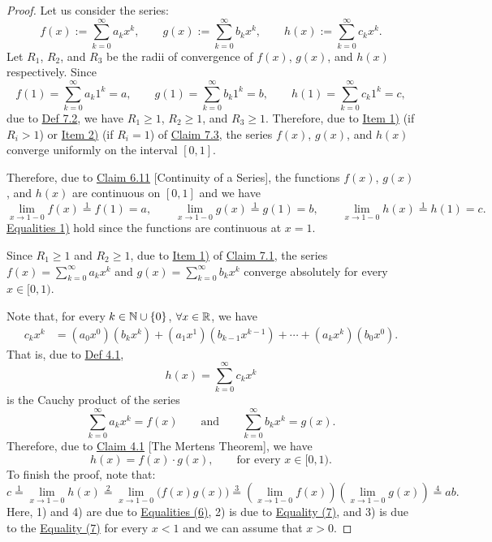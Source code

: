 \begin{proof}
Let us consider the series:
\[
f(x):=\sum_{k=0}^{\infty}a_kx^k,
\qquad
g(x):=\sum_{k=0}^{\infty}b_kx^k,
\qquad
h(x):=\sum_{k=0}^{\infty}c_kx^k.
\]
Let $R_1$, $R_2$, and $R_3$ be the radii of convergence of $f(x)$, $g(x)$, and $h(x)$ respectively.
Since
\[
f(1)=\sum_{k=0}^{\infty}a_k1^k=a,
\qquad
g(1)=\sum_{k=0}^{\infty}b_k1^k=b,
\qquad
h(1)=\sum_{k=0}^{\infty}c_k1^k=c,
\]
due to \hyperref[def:7.2]{Def 7.2}, we have $R_1\geq1$, $R_2\geq1$, and $R_3\geq1$.
Therefore, due to \hyperref[item:claim:7.3:1]{Item 1)} (if $R_i>1$) or \hyperref[item:claim:7.3:2]{Item 2)} (if $R_i=1$) of \hyperref[claim:7.3]{Claim 7.3}, the series $f(x)$, $g(x)$, and $h(x)$ converge uniformly on the interval $[0,1]$.

Therefore, due to \hyperref[claim:6.11]{Claim 6.11} [Continuity of a Series], the functions $f(x)$, $g(x)$, and $h(x)$ are continuous on $[0,1]$ and we have
\[
\lim_{x\to1-0}f(x)\overset{1}{=}f(1)=a,
\qquad
\lim_{x\to1-0}g(x)\overset{1}{=}g(1)=b,
\qquad
\lim_{x\to1-0}h(x)\overset{1}{=}h(1)=c.
\tag{6}\label{eq:7:6:1}
\]
\hyperref[eq:7:6:1]{Equalities 1)} hold since the functions are continuous at $x=1$.

Since $R_1\geq1$ and $R_2\geq1$, due to \hyperref[item:claim:7.1:1]{Item 1)} of \hyperref[claim:7.1]{Claim 7.1}, the series $f(x)=\sum_{k=0}^{\infty}a_kx^k$ and $g(x)=\sum_{k=0}^{\infty}b_kx^k$ converge absolutely for every $x\in[0,1)$.

Note that, for every $k\in\mathbb{N}\cup\{0\}$, $\forall x\in\mathbb{R}$, we have
\begin{align*}
c_kx^k
&=(a_0x^0)(b_kx^k)+(a_1x^1)(b_{k-1}x^{k-1})+\cdots+(a_kx^k)(b_0x^0).
\end{align*}
That is, due to \hyperref[def:4.1]{Def 4.1},
\[
h(x)=\sum_{k=0}^{\infty}c_kx^k
\]
is the Cauchy product of the series
\[
\sum_{k=0}^{\infty}a_kx^k=f(x)
\qquad\text{and}\qquad
\sum_{k=0}^{\infty}b_kx^k=g(x).
\]
Therefore, due to \hyperref[claim:4.1]{Claim 4.1} [The Mertens Theorem], we have
\[
h(x)=f(x)\cdot g(x),
\qquad \text{for every }x\in[0,1).
\tag{7}\label{eq:7:7:1}
\]
To finish the proof, note that:
\[
c
\overset{1}{=}
\lim_{x\to1-0}h(x)
\overset{2}{=}
\lim_{x\to1-0}\bigl(f(x)g(x)\bigr)
\overset{3}{=}
\left(\lim_{x\to1-0}f(x)\right)
\left(\lim_{x\to1-0}g(x)\right)
\overset{4}{=}
ab.
\]
Here, 1) and 4) are due to \hyperref[eq:7:6:1]{Equalities (6)}, 2) is due to \hyperref[eq:7:7:1]{Equality (7)}, and 3) is due to the \hyperref[eq:7:7:1]{Equality (7)} for every $x<1$ and we can assume that $x>0$.
\end{proof}

